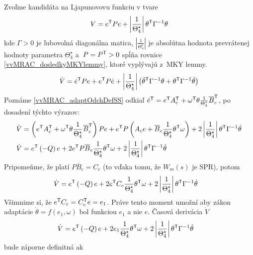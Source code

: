 \documentclass[a4paper, 10pt, ]{article}
\begin{document}
Zvoľme kandidáta na Ljapunovovu funkciu v tvare
\begin{equation}
	V = e^{\mathsf{T}} P e + \left| \frac{1}{\Theta_4^\star} \right| \theta^{\mathsf{T}} \Gamma^{-1} \theta
\end{equation}
kde $\Gamma > 0$ je ľubovolná diagonálna matica, $\left| \frac{1}{\Theta_4^\star} \right|$ je absolútna hodnota prevrátenej hodnoty parametra $\Theta_4^\star$ a~$P = P^{\mathsf{T}}>0$ spĺňa rovnice \eqref{vvMRAC_dosledkyMKYlemmy}, ktoré vyplývajú z~MKY lemmy.
\begin{equation}
	\dot{V} = \dot{e}^{\mathsf{T}} P e + e^{\mathsf{T}} P \dot{e} + \left| \frac{1}{\Theta_4^\star} \right| \left( \dot{\theta}^{\mathsf{T}} \Gamma^{-1} \theta + \theta^{\mathsf{T}} \Gamma^{-1} \dot{\theta} \right)
\end{equation}
Poznáme \eqref{vvMRAC_adaptOdchDefSS} odkiaľ $ \dot{e}^{\mathsf{T}} = e^{\mathsf{T}} A_c^{\mathsf{T}} + \omega^{\mathsf{T}} \theta \frac{1}{\Theta_4^\star} \overline{B}_c^{\mathsf{T}} $, po dosadení týchto výrazov:
\begin{align}
	\dot{V} &= \left( e^{\mathsf{T}} A_c^{\mathsf{T}} + \omega^{\mathsf{T}} \theta \frac{1}{\Theta_4^\star} \overline{B}_c^{\mathsf{T}} \right) P e  + e^{\mathsf{T}} P \left( A_c  e + \overline{B}_c \frac{1}{\Theta_4^\star} \theta^{\mathsf{T}} \omega \right) +  2 \left| \frac{1}{\Theta_4^\star} \right| \theta^{\mathsf{T}} \Gamma^{-1} \dot{\theta} \\
	\dot{V} &= e^{\mathsf{T}} \left( - Q \right) e + 2 e^{\mathsf{T}} P \overline{B}_c \frac{1}{\Theta_4^\star} \theta^{\mathsf{T}} \omega + 2 \left| \frac{1}{\Theta_4^\star} \right| \theta^{\mathsf{T}} \Gamma^{-1} \dot{\theta}
\end{align}
Pripomeňme, že platí $P \overline{B}_c = {C_c}$ (to vďaka tomu, že $W_m(s)$ je SPR), potom
\begin{align}
	\dot{V} &= e^{\mathsf{T}} \left( - Q \right) e + 2 e^{\mathsf{T}} C_c \frac{1}{\Theta_4^\star} \theta^{\mathsf{T}} \omega + 2 \left| \frac{1}{\Theta_4^\star} \right| \theta^{\mathsf{T}} \Gamma^{-1} \dot{\theta}
\end{align}
Všimnime si, že $e^{\mathsf{T}} C_c = C_c^{\mathsf{T}} e = e_1$. Práve tento moment umožní aby zákon adaptácie $\dot{\theta} = f(e_1, \omega)$ bol funkciou $e_1$ a nie $e$. Časová derivácia $\dot{V}$
\begin{align}
	\dot{V} &= e^{\mathsf{T}} \left( - Q \right) e + 2 e_1 \frac{1}{\Theta_4^\star} \theta^{\mathsf{T}} \omega + 2 \left| \frac{1}{\Theta_4^\star} \right| \theta^{\mathsf{T}} \Gamma^{-1} \dot{\theta}
\end{align}
bude záporne definitná ak
\end{document}
